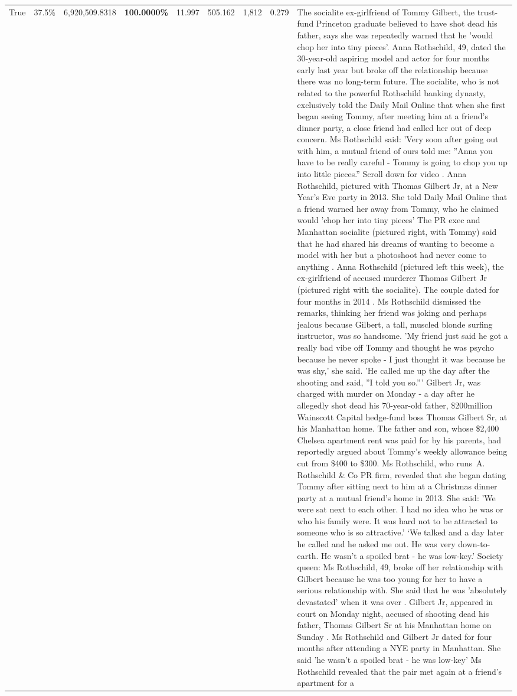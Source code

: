 \begin{table}[H]
\begin{tabular}{lllrlllll}
True & 37.5\% & 6,920,509.8318 & \bfseries \color{red} 100.0000\% & 11.997 & 505.162 & 1,812 & 0.279 & The socialite ex-girlfriend of Tommy Gilbert, the trust-fund Princeton graduate believed to have shot dead his father, says she was repeatedly warned that he 'would chop her into tiny pieces'. Anna Rothschild, 49, dated the 30-year-old aspiring model and actor for four months early last year but broke off the relationship because there was no long-term future. The socialite, who is not related to the powerful Rothschild banking dynasty, exclusively told the Daily Mail Online that when she first began seeing Tommy, after meeting him at a friend's dinner party, a close friend had called her out of deep concern. Ms Rothschild said: 'Very soon after going out with him, a mutual friend of ours told me: ''Anna you have to be really careful - Tommy is going to chop you up into little pieces.'' Scroll down for video . Anna Rothschild, pictured with Thomas Gilbert Jr, at a New Year's Eve party in 2013. She told Daily Mail Online that a friend warned her away from Tommy, who he claimed would 'chop her into tiny pieces' The PR exec and Manhattan socialite (pictured right, with Tommy) said that he had shared his dreams of wanting to become a model with her but a photoshoot had never come to anything . Anna Rothschild (pictured left this week), the ex-girlfriend of accused murderer Thomas Gilbert Jr (pictured right with the socialite). The couple dated for four months in 2014 . Ms Rothschild dismissed the remarks, thinking her friend was joking and perhaps jealous because Gilbert, a tall, muscled blonde surfing instructor, was so handsome. 'My friend just said he got a really bad vibe off Tommy and thought he was psycho because he never spoke - I just thought it was because he was shy,' she said. 'He called me up the day after the shooting and said, ''I told you so.''' Gilbert Jr, was charged with murder on Monday - a day after he allegedly shot dead his 70-year-old father, \$200million Wainscott Capital hedge-fund boss Thomas Gilbert Sr, at his Manhattan home. The father and son, whose \$2,400 Chelsea apartment rent was paid for by his parents, had reportedly argued about Tommy's weekly allowance being cut from \$400 to \$300. Ms Rothschild, who runs A. Rothschild \& Co PR firm, revealed that she began dating Tommy after sitting next to him at a Christmas dinner party at a mutual friend's home in 2013. She said: 'We were sat next to each other. I had no idea who he was or who his family were. It was hard not to be attracted to someone who is so attractive.' ‘We talked and a day later he called and he asked me out. He was very down-to-earth. He wasn’t a spoiled brat - he was low-key.’ Society queen: Ms Rothschild, 49, broke off her relationship with Gilbert because he was too young for her to have a serious relationship with. She said that he was 'absolutely devastated' when it was over . Gilbert Jr, appeared in court on Monday night, accused of shooting dead his father, Thomas Gilbert Sr at his Manhattan home on Sunday . Ms Rothschild and Gilbert Jr dated for four months after attending a NYE party in Manhattan. She said 'he wasn't a spoiled brat - he was low-key' Ms Rothschild revealed that the pair met again at a friend’s apartment for a 
\end{tabular}
\end{table}
